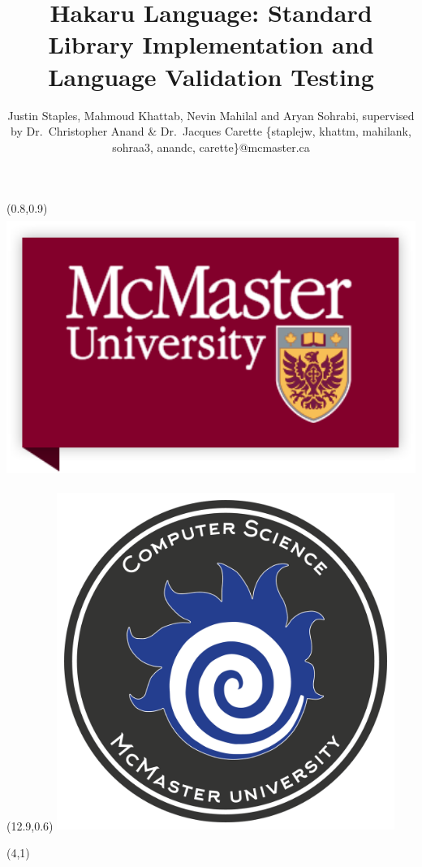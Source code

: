 \documentclass[22pt]{beamer}
\title{Hakaru Language: Standard Library Implementation and Language Validation Testing}
\subtitle{}  %
\author[Justin Staples, Mahmoud Khattab, Nevin Mahilal and Aryan Sohrabi]{Justin Staples, Mahmoud Khattab, Nevin Mahilal and Aryan Sohrabi, supervised by Dr.~Christopher Anand \& Dr.~Jacques Carette \vspace{0.3cm} \newline \small \{staplejw, khattm, mahilank, sohraa3, anandc, carette\}@mcmaster.ca}
\institute[McMaster University]{\small{Department of Computing and Software, McMaster University}}
\date{}
\begin{document}

\begin{frame}[fragile]

\begin{textblock}{2}(0.8,0.9)
\includegraphics[height=8.5cm]{mac.png}
\end{textblock}

\begin{textblock}{2}(12.9,0.6)
\includegraphics[height=11cm]{fireball.png} 
\end{textblock}

\begin{textblock}{8}(4,1)
\titlepage
\end{textblock}


\end{frame}
\end{document}
